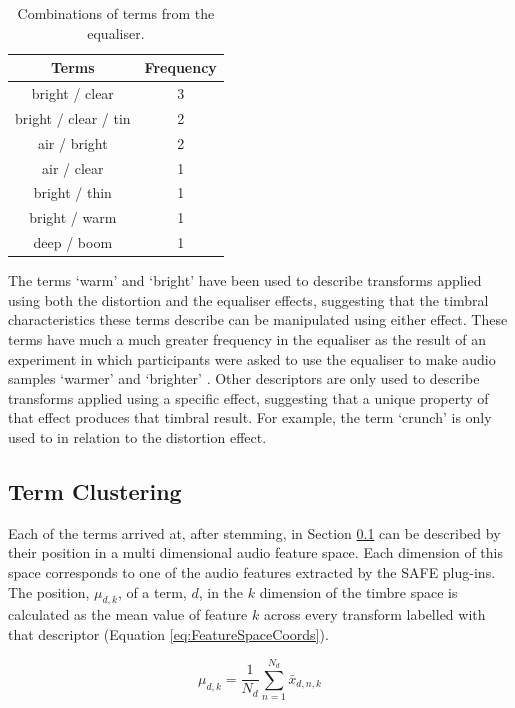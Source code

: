 		\begin{table}[h!]
			\centering
			\begin{tabular}{|c|c|}
				\hline
				\bf{Terms} & \bf{Frequency} \tabularnewline
				\hline
				\hline
				bright / clear & 3 \tabularnewline
				\hline
				bright / clear / tin & 2 \tabularnewline
				\hline
				air / bright & 2 \tabularnewline
				\hline
				air / clear & 1 \tabularnewline
				\hline
				bright / thin & 1 \tabularnewline
				\hline
				bright / warm & 1 \tabularnewline
				\hline
				deep / boom & 1 \tabularnewline
				\hline
			\end{tabular}
			\caption{Combinations of terms from the equaliser.}
			\label{tab:EqualiserTermCombinations}
		\end{table}

		The terms `warm' and `bright' have been used to describe transforms applied using both the distortion and
		the equaliser effects, suggesting that the timbral characteristics these terms describe can be manipulated
		using either effect. These terms have much a much greater frequency in the equaliser as the result of an
		experiment in which participants were asked to use the equaliser to make audio samples `warmer' and
		`brighter' \citep{stasis2015a}. Other descriptors are only used to describe transforms applied using a
		specific effect, suggesting that a unique property of that effect produces that timbral result. For
		example, the term `crunch' is only used to in relation to the distortion effect.

	\subsection{Term Clustering}
	\label{sec:TimbreEvaluation-Analysis-TermClustering}
		Each of the terms arrived at, after stemming, in Section \ref{sec:TimbreEvaluation-Analysis-TermClustering}
		can be described by their position in a multi dimensional audio feature space. Each dimension of this space
		corresponds to one of the audio features extracted by the SAFE plug-ins. The position, $\mu_{d,k}$, of a
		term, $d$, in the $k$ dimension of the timbre space is calculated as the mean value of feature
		$k$ across every transform labelled with that descriptor (Equation \ref{eq:FeatureSpaceCoords}).

		\begin{equation}
			\mu_{d,k} = \frac{1}{N_{d}} \sum_{n = 1}^{N_{d}} \bar{x}_{d,n,k}
			\label{eq:FeatureSpaceCoords}
		\end{equation}

